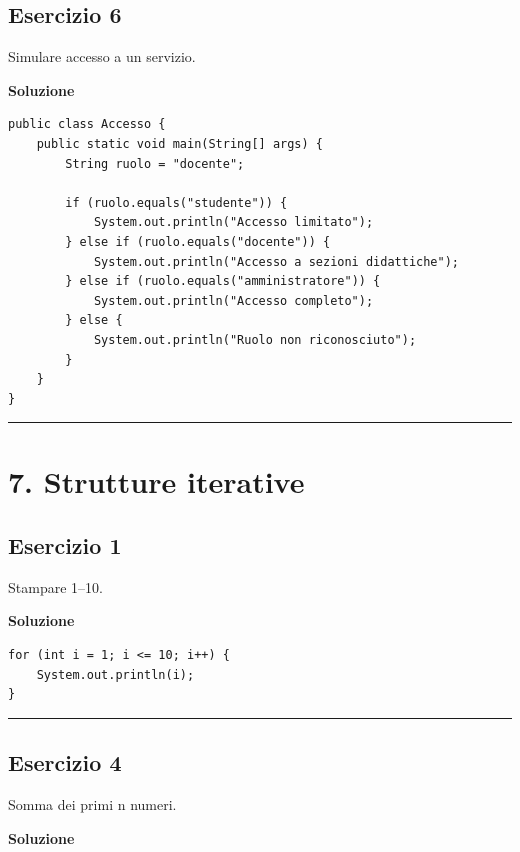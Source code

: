 \documentclass[
]{article}
\begin{document}
\subsection{Esercizio 6}\label{esercizio-6-1}

Simulare accesso a un servizio.

\textbf{Soluzione}

\begin{verbatim}
public class Accesso {
    public static void main(String[] args) {
        String ruolo = "docente";

        if (ruolo.equals("studente")) {
            System.out.println("Accesso limitato");
        } else if (ruolo.equals("docente")) {
            System.out.println("Accesso a sezioni didattiche");
        } else if (ruolo.equals("amministratore")) {
            System.out.println("Accesso completo");
        } else {
            System.out.println("Ruolo non riconosciuto");
        }
    }
}
\end{verbatim}

\begin{center}\rule{0.5\linewidth}{0.5pt}\end{center}

\section{7. Strutture iterative}\label{strutture-iterative}

\subsection{Esercizio 1}\label{esercizio-1-6}

Stampare 1--10.

\textbf{Soluzione}

\begin{verbatim}
for (int i = 1; i <= 10; i++) {
    System.out.println(i);
}
\end{verbatim}

\begin{center}\rule{0.5\linewidth}{0.5pt}\end{center}

\subsection{Esercizio 4}\label{esercizio-4-5}

Somma dei primi n numeri.

\textbf{Soluzione}
\end{document}
